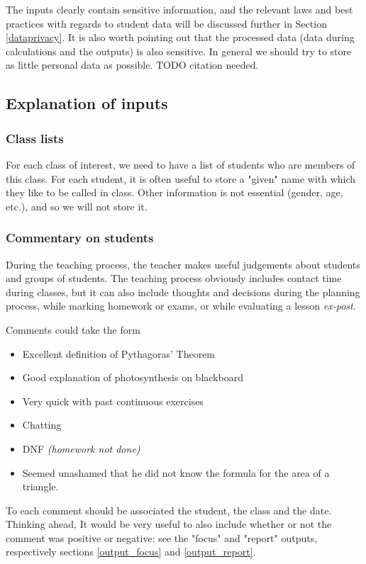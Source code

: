 \documentclass[10pt]{article}
\begin{document}
\vspace{5mm}

The inputs clearly contain sensitive information, and the relevant laws and best practices with regards to student data will be discussed further in Section \ref{dataprivacy}. It is also worth pointing out that the processed data (data during calculations and the outputs) is also sensitive. In general we should try to store as little personal data as possible. TODO citation needed.

\subsection{Explanation of inputs}

\subsubsection{Class lists}
For each class of interest, we need to have a list of students who are members of this class. For each student, it is often useful to store a "given" name with which they like to be called in class. Other information is not essential (gender, age, etc.), and so we will not store it.

\subsubsection{Commentary on students}
During the teaching process, the teacher makes useful judgements about students and groups of students. The teaching process obviously includes contact time during classes, but it can also include thoughts and decisions during the planning process, while marking homework or exams, or while evaluating a lesson \emph{ex-post}.

Comments could take the form
\begin{itemize}
\item Excellent definition of Pythagoras' Theorem
\item Good explanation of photosynthesis on blackboard
\item Very quick with past continuous exercises
\item Chatting
\item DNF \emph{(homework not done)}
\item Seemed unashamed that he did not know the formula for the area of a triangle.
\end{itemize}

To each comment should be associated the student, the class and the date. Thinking ahead, It would be very useful to also include whether or not the comment was positive or negative: see the "focus" and "report" outputs, respectively sections \ref{output_focus} and \ref{output_report}.
\end{document}

